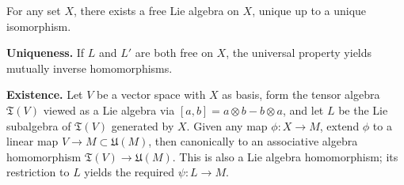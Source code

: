 For any set $X$, there exists a free Lie algebra on $X$, unique up to a unique isomorphism.

\textbf{Uniqueness.} If $L$ and $L'$ are both free on $X$, the universal property yields mutually inverse homomorphisms.

\textbf{Existence.} Let $V$ be a vector space with $X$ as basis, form the tensor algebra $\mathfrak{T}(V)$ viewed as a Lie algebra via $[a, b] = a \otimes b - b \otimes a$, and let $L$ be the Lie subalgebra of $\mathfrak{T}(V)$ generated by $X$. Given any map $\phi: X \to M$, extend $\phi$ to a linear map $V \to M \subset \mathfrak{U}(M)$, then canonically to an associative algebra homomorphism $\mathfrak{T}(V) \to \mathfrak{U}(M)$. This is also a Lie algebra homomorphism; its restriction to $L$ yields the required $\psi: L \to M$.
